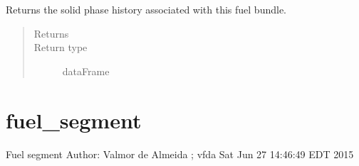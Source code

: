 \documentclass[letterpaper,10pt,openany,oneside,english]{sphinxmanual}
\begin{document}
\begin{fulllineitems}
\begin{fulllineitems}
\begin{quote}
\begin{description}
\end{description}\end{quote}

\end{fulllineitems}


\begin{fulllineitems}
\label{\detokenize{support_rst/fuel_bundle:fuel_bundle.FuelBundle.solid_phase}}
Returns the solid phase history associated with this fuel bundle.
\begin{quote}\begin{description}
\item[{Returns}] \leavevmode
{}

\item[{Return type}] \leavevmode
dataFrame

\end{description}\end{quote}

\end{fulllineitems}


\end{fulllineitems}



\section{fuel\_segment}
\label{\detokenize{support_rst/fuel_segment:module-fuel_segment}}\label{\detokenize{support_rst/fuel_segment:fuel-segment}}\label{\detokenize{support_rst/fuel_segment::doc}}
Fuel segment
Author: Valmor de Almeida ; vfda
Sat Jun 27 14:46:49 EDT 2015
\end{document}
